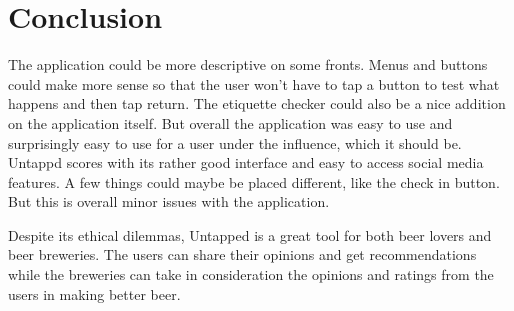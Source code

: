 \documentclass[12pt]{article}
\begin{document}
\section{Conclusion}
The application could be more descriptive on some fronts. Menus and buttons
could make more sense so that the user won’t have to tap a button to test what
happens and then tap return. The etiquette checker could also be a nice addition
on the application itself. But overall the application was easy to use and
surprisingly easy to use for a user under the influence, which it should be.
Untappd scores with its rather good interface and easy to access social media
features. A few things could maybe be placed different, like the check in
button. But this is overall minor issues with the application.

Despite its ethical dilemmas, Untapped is a great tool for both beer lovers and
beer breweries. The users can share their opinions and get recommendations while
the breweries can take in consideration the opinions and ratings from the users
in making better beer.


\clearpage


\end{document}
